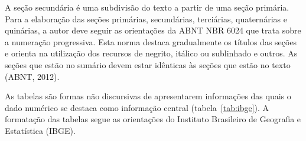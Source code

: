 A seção secundária é uma subdivisão do texto a partir de uma seção primária.
Para a elaboração das seções primárias, secundárias, terciárias, quaternárias
e quinárias, a autor deve seguir as orientações da ABNT NBR 6024 que trata
sobre a numeração progressiva. Esta norma destaca gradualmente os títulos das
seções e orienta na utilização dos recursos de negrito, itálico ou sublinhado
e outros. As seções que estão no sumário devem estar idênticas às seções que
estão no texto (ABNT, 2012).

As tabelas são formas não discursivas de apresentarem informações das quais o
dado numérico se destaca como informação central (tabela~\ref{tab:ibge}). A
formatação das tabelas segue as orientações do Instituto Brasileiro de
Geografia e Estatística (IBGE).

\vspace{15pt}
